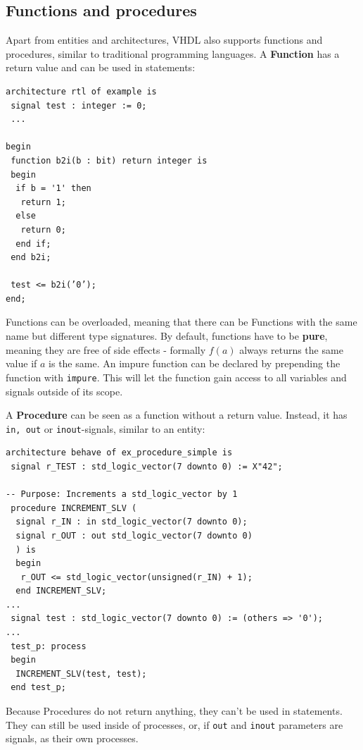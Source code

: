 \documentclass{report}
\newcommand{\tbf}{\textbf}
\newcommand*{\newpar}{\par\vspace{\baselineskip}\noindent} %
\begin{document}
\subsection{Functions and procedures}
Apart from entities and architectures, VHDL also supports functions and procedures, similar to traditional programming languages. A \tbf{Function} has a return value and can be used in statements:
\begin{verbatim}
architecture rtl of example is
 signal test : integer := 0;
 ...

begin
 function b2i(b : bit) return integer is
 begin
  if b = '1' then
   return 1;
  else
   return 0;
  end if;
 end b2i;

 test <= b2i(’0’);
end;
\end{verbatim}
Functions can be overloaded, meaning that there can be Functions with the same name but different type signatures. By default, functions have to be \tbf{pure}, meaning they are free of side effects - formally $f(a)$ always returns the same value if $a$ is the same. An impure function can be declared by prepending the function with \texttt{impure}. This will let the function gain access to all variables and signals outside of its scope.
\newpar
A \tbf{Procedure} can be seen as a function without a return value. Instead, it has \texttt{in, out} or \texttt{inout}-signals, similar to an entity:
\begin{verbatim}
architecture behave of ex_procedure_simple is
 signal r_TEST : std_logic_vector(7 downto 0) := X"42";

-- Purpose: Increments a std_logic_vector by 1
 procedure INCREMENT_SLV (
  signal r_IN : in std_logic_vector(7 downto 0);
  signal r_OUT : out std_logic_vector(7 downto 0)
  ) is
  begin
   r_OUT <= std_logic_vector(unsigned(r_IN) + 1);
  end INCREMENT_SLV;
...
 signal test : std_logic_vector(7 downto 0) := (others => '0');
...
 test_p: process
 begin
  INCREMENT_SLV(test, test);
 end test_p;
\end{verbatim}
Because Procedures do not return anything, they can't be used in statements. They can still be used inside of processes, or, if \texttt{out} and \texttt{inout} parameters are signals, as their own processes.
\end{document}
